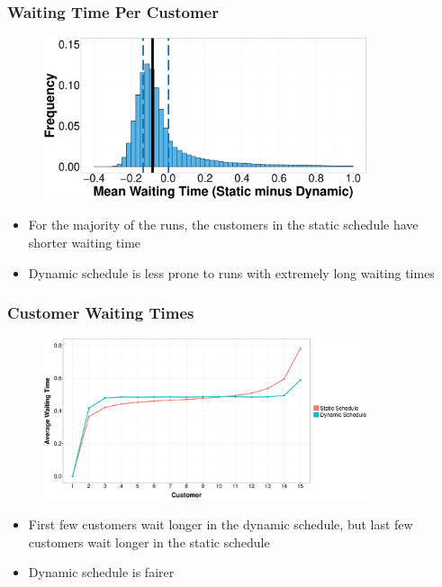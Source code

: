 \documentclass{beamer}
\begin{document}
\begin{frame}
	\frametitle{Waiting Time Per Customer}

	\begin{figure}
		\centering
		\includegraphics[width=0.85\textwidth]{WT_Hist_Diff.eps}
	\end{figure}

	\begin{itemize}
		\item For the majority of the runs, the customers in the static schedule have shorter waiting time
		\item Dynamic schedule is less prone to runs with extremely long waiting times
	\end{itemize}
\end{frame}

\begin{frame}
	\frametitle{Customer Waiting Times}

	\begin{figure}
			\centering
			\includegraphics[width=0.85\textwidth]{WT_Line_Avg.eps}
	\end{figure}
		
	\begin{itemize}
		\item First few customers wait longer in the dynamic schedule, but last few customers wait longer in the static schedule
		\item Dynamic schedule is fairer
	\end{itemize}
\end{frame}
\end{document}
